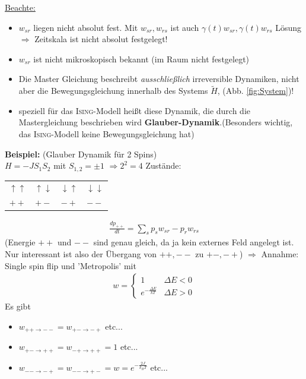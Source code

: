 \documentclass[12pt]{article}
\begin{document}
\underline{Beachte:} 
\begin{itemize}
\item $w_{sr}$ liegen nicht absolut fest. Mit $w_{sr}, w_{rs}$ ist auch $\gamma (t) w_{sr}, \gamma(t) w_{rs}$ Lösung \\  $\Rightarrow$ Zeitskala ist nicht absolut festgelegt!
\item $w_{sr}$ ist nicht mikroskopisch bekannt (im Raum nicht festgelegt)
\item Die Master Gleichung beschreibt \textit{ausschließlich} irreversible Dynamiken, nicht aber die Bewegungsgleichung innerhalb des Systems $\tilde{H}$, (Abb. \ref{fig:System})! 
\item speziell für das \textsc{Ising}-Modell heißt diese Dynamik, die durch die Mastergleichung beschrieben wird  \textbf{Glauber-Dynamik}.(Besonders wichtig, das \textsc{Ising}-Modell keine Bewegungsgleichung hat)
\end{itemize}


\textbf{Beispiel:} (Glauber Dynamik für 2 Spins) \\ 
$H=-J S_1 S_2$ mit $S_{1,2} = \pm 1$
$\Rightarrow 2^2 =4$ Zustände: 
\begin{center}
\begin{tabular}{c c c c}
$\uparrow \uparrow$ & $\uparrow \downarrow$ & $\downarrow \uparrow$ & $ \downarrow \downarrow$ \\ 
$++$ & $+-$ & $-+$ & $--$ \\ 
\end{tabular} 
\end{center}

 \begin{align*}
 \frac{dp_{++}}{dt} = \sum_s p_s w_{sr} - p_r w_{rs}
 \end{align*}
 (Energie $++$ und $--$ sind genau gleich, da ja kein externes Feld angelegt ist. Nur interessant ist also der Übergang von $++, --$ zu $+-,-+$) $\Rightarrow$ Annahme: Single spin flip und 'Metropolis' mit 
 \begin{align*}
 w=
 \begin{cases}
 1 & \Delta E <0 \\
 e^{- \frac{\Delta E}{kT}} & \Delta E>0
 \end{cases}
 \end{align*}
 Es gibt 
 \begin{itemize}
 \item  $w_{++ \rightarrow --}= w_{+- \rightarrow -+}$ etc...
 \item $w_{+- \rightarrow ++}= w_{-+ \rightarrow ++}=1$ etc...
 \item $w_{-- \rightarrow -+}= w_{-- \rightarrow +-}= w= e^{-\frac{2J}{k_BT}}$ etc... 
 \end{itemize}
 
\end{document}
